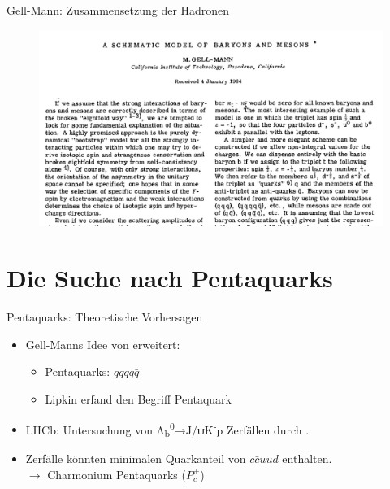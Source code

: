 \documentclass[aspectratio=169]{beamer} %
\begin{document}
              \begin{frame}{Gell-Mann: Zusammensetzung der Hadronen}
                \begin{figure}\includegraphics[height=0.85\textheight, width=\textwidth, keepaspectratio]{Images/8ad56d13-e301-4a37-be9c-7077ac16ce16.jpg}\\\small\cite[S.~214]{GellMann.1964}\end{figure}
    \end{frame}

    \section{Die Suche nach Pentaquarks}

    \begin{frame}{Pentaquarks: Theoretische Vorhersagen}
      \begin{itemize}
        \item Gell-Manns Idee von \textcite{Hogaasen.1978,Strottman.1979} erweitert:
        \begin{itemize}
          \item Pentaquarks: $qqqq\bar{q}$
          \item Lipkin erfand den Begriff Pentaquark \parencite{Lipkin.1987}
        \end{itemize}
        \item LHCb: Untersuchung von Λ\textsubscript{b}\textsuperscript{0}→J/ψK\textsuperscript{-}p Zerfällen durch \textcite{Aaij.2015}.
        \item Zerfälle könnten minimalen Quarkanteil von $c\bar{c}uud$ enthalten. \\ $\rightarrow$ Charmonium Pentaquarks ($P_c^+$)
      \end{itemize}
    \end{frame}
\end{document}

